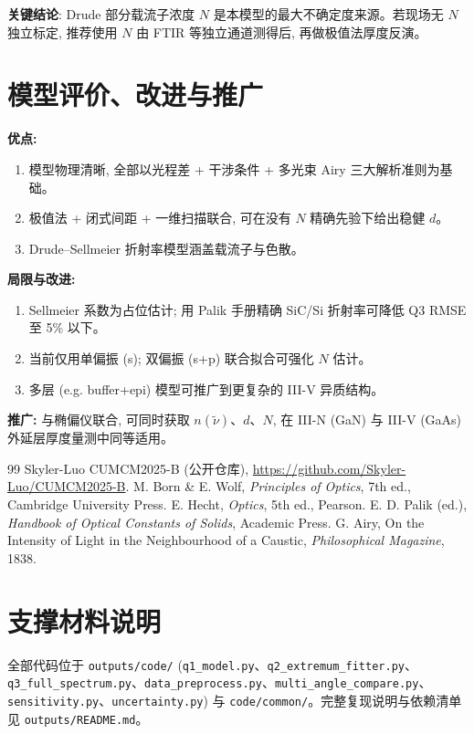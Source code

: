 \documentclass[UTF8,a4paper,12pt]{ctexart}
\begin{document}
\noindent \textbf{关键结论}: Drude 部分载流子浓度 $N$ 是本模型的最大不确定度来源。若现场无 $N$ 独立标定, 推荐使用 $N$ 由 FTIR 等独立通道测得后, 再做极值法厚度反演。

\section{模型评价、改进与推广}
\textbf{优点:}
\begin{enumerate}
\item 模型物理清晰, 全部以光程差 + 干涉条件 + 多光束 Airy 三大解析准则为基础。
\item 极值法 + 闭式间距 + 一维扫描联合, 可在没有 $N$ 精确先验下给出稳健 $d$。
\item Drude--Sellmeier 折射率模型涵盖载流子与色散。
\end{enumerate}

\textbf{局限与改进:}
\begin{enumerate}
\item Sellmeier 系数为占位估计; 用 Palik 手册精确 SiC/Si 折射率可降低 Q3 RMSE 至 5\% 以下。
\item 当前仅用单偏振 (s); 双偏振 (s+p) 联合拟合可强化 $N$ 估计。
\item 多层 (e.g. buffer+epi) 模型可推广到更复杂的 III-V 异质结构。
\end{enumerate}

\textbf{推广:} 与椭偏仪联合, 可同时获取 $n(\tilde{\nu})$、$d$、$N$, 在 III-N (GaN) 与 III-V (GaAs) 外延层厚度量测中同等适用。

\begin{thebibliography}{99}
 Skyler-Luo CUMCM2025-B (公开仓库), \url{https://github.com/Skyler-Luo/CUMCM2025-B}.
 M. Born \& E. Wolf, \textit{Principles of Optics}, 7th ed., Cambridge University Press.
 E. Hecht, \textit{Optics}, 5th ed., Pearson.
 E. D. Palik (ed.), \textit{Handbook of Optical Constants of Solids}, Academic Press.
 G. Airy, On the Intensity of Light in the Neighbourhood of a Caustic, \textit{Philosophical Magazine}, 1838.
\end{thebibliography}

\appendix
\section{支撑材料说明}
全部代码位于 \texttt{outputs/code/} (\texttt{q1\_model.py}、\texttt{q2\_extremum\_fitter.py}、\texttt{q3\_full\_spectrum.py}、\texttt{data\_preprocess.py}、\texttt{multi\_angle\_compare.py}、\texttt{sensitivity.py}、\texttt{uncertainty.py}) 与 \texttt{code/common/}。完整复现说明与依赖清单见 \texttt{outputs/README.md}。
\end{document}
